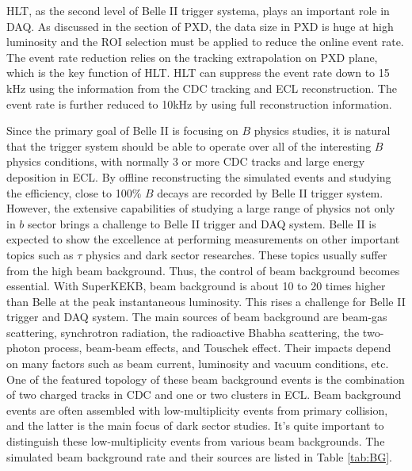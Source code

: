 HLT, as the second level of Belle II trigger systema, plays an important role in DAQ. As discussed in the section of PXD, the data size in PXD is huge at high luminosity and the ROI selection must be applied to reduce the online event rate. The event rate reduction relies on the tracking extrapolation on PXD plane, which is the key function of HLT. HLT can suppress the event rate down to 15 kHz using the information from the CDC tracking and ECL reconstruction. The event rate is further reduced to 10kHz by using full reconstruction information. 

Since the primary goal of Belle II is focusing on $B$ physics studies, it is natural that the trigger system should be able to operate over all of the interesting $B$ physics conditions, with normally 3 or more CDC tracks and large energy deposition in ECL. By offline reconstructing the simulated events and studying the efficiency, close to 100\% $B$ decays are recorded by Belle II trigger system. However, the extensive capabilities of studying a large range of physics not only in $b$ sector brings a challenge to Belle II trigger and DAQ system. Belle II is expected to show the excellence at performing measurements on other important topics such as $\tau$ physics and dark sector researches. These topics usually suffer from the high beam background. Thus, the control of beam background becomes essential.
With SuperKEKB, beam background is about 10 to 20 times higher than Belle at the peak instantaneous luminosity. This rises a challenge for Belle II trigger and DAQ system. The main sources of beam background are beam-gas scattering, synchrotron radiation, the radioactive Bhabha scattering, the two-photon process, beam-beam effects, and Touschek effect. Their impacts depend on many factors such as beam current, luminosity and vacuum conditions, etc. One of the featured topology of these beam background events is the combination of two charged tracks in CDC and one or two clusters in ECL. Beam background events are often assembled with low-multiplicity events from primary collision, and the latter is the main focus of dark sector studies. It's quite important to distinguish these low-multiplicity events from various beam backgrounds. The simulated beam background rate and their sources are listed in Table \ref{tab:BG}.

